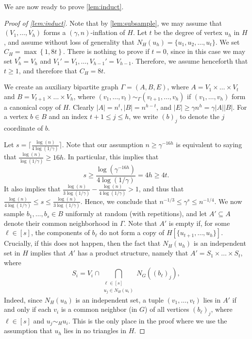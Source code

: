 \documentclass{aic}
\theoremstyle{plain}
\theoremstyle{remark}
\newcommand\cei[1]{\lceil #1 \rceil}
\begin{document}
We are now ready to prove \cref{lem:induct}.

\begin{proof}[Proof of \cref{lem:induct}]
Note that by \cref{lem:subsample}, we may assume that $(V_1,\dots,V_h)$ forms a $(\gamma,n)$-inflation of $H$.
Let $t$ be the degree of vertex $u_h$ in $H$, and assume without loss of generality that $N_H(u_h) = \{u_1,u_2,\dots,u_t\}$. 
We set $C_H = \max \left\{ 1, 8t \right\}$. 
There is nothing to prove if $t=0$, since in this case we may set $V_h^*=V_h$ and $V_1'=V_1,\dots,V_{h-1}'=V_{h-1}$. Therefore, we assume henceforth that $t\geq 1$, and therefore that $C_H=8t$.


We create an auxiliary bipartite graph $\Gamma = (A,B,E)$, where $A = V_1\times \dots\times V_t$ and $B = V_{t+1}\times\dots \times V_h$, where $(v_1,\dots,v_t)\sim_\Gamma (v_{t+1},\dots,v_h)$ if $(v_1,\dots,v_h)$ form a canonical copy of $H$. Clearly $|A|= n^t, |B|=n^{h-t}$, and $|E|\ge \gamma n^h = \gamma |A||B|$. For a vertex $b \in B$ and an index $t +1 \leq j \leq h$, we write $(b)_j$ to denote the $j$ coordinate of $b$.


Let $s = \cei{\frac{\log(n)}{4\log(1/\gamma)}}$. Note that our assumption $n \geq \gamma^{-16h}$ is equivalent to saying that $\frac{\log (n)}{\log(1/\gamma)}\geq 16h$. In particular, this implies that
\begin{equation}\label{eq:s LB}
s \geq \frac{\log(\gamma^{-16h})}{4\log(1/\gamma)} = 4h \geq 4t.
\end{equation}
It also implies that $\frac{\log(n)}{3 \log(1/\gamma)} - \frac{\log(n)}{4 \log(1/\gamma)}>1$, and thus that
$\frac{\log(n)}{4 \log(1/\gamma)}\leq s \leq \frac{\log(n)}{3 \log(1/\gamma)}$. Hence, we conclude that $n^{-1/3}\leq \gamma^s \leq n^{-1/4}$.
We now sample $b_1,\dots,b_s\in B$ uniformly at random (with repetitions), and let $A'\subseteq A$ denote their common neighborhood in $\Gamma$. Note that $A'$ is empty if, for some $\ell \in [s]$, the components of $b_\ell$ do not form a copy of $H[\{u_{t+1},\dots,u_h\}]$. 
Crucially, if this does not happen, then the fact that $N_H(u_h)$ is an independent set in $H$ implies that $A'$ has a product structure, namely that $A' = S_1 \times \dots \times S_t$, where
\[
S_i =
V_i\cap \bigcap_{\substack{\ell \in [s]\\u_j \in N_H(u_i)}} N_G((b_\ell)_j),
\]
Indeed, since $N_H(u_h)$ is an independent set, a tuple $(v_1,\dots,v_t)$ lies in $A'$ if and only if each $v_i$ is a common neighbor (in $G$) of all vertices $(b_\ell)_j$, where $\ell \in [s]$ and $u_j \sim_H u_i$. This is the only place in the proof where we use the assumption that $u_h$ lies in no triangles in $H$.



\end{proof}
\end{document}
